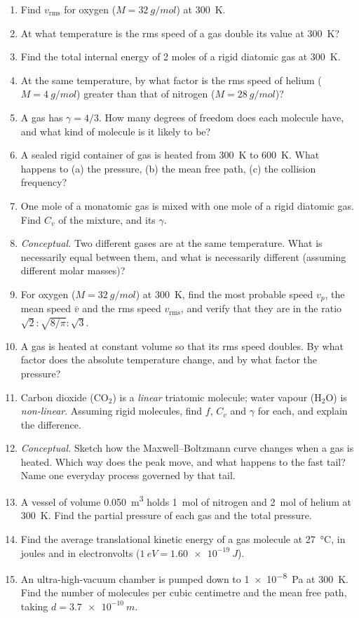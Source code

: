 \begin{enumerate}[itemsep=3pt]
\item Find $v_{\text{rms}}$ for oxygen ($M=\SI{32}{g/mol}$) at \SI{300}{K}.
\item At what temperature is the rms speed of a gas double its value at \SI{300}{K}?
\item Find the total internal energy of 2 moles of a rigid diatomic gas at \SI{300}{K}.
\item At the same temperature, by what factor is the rms speed of helium ($M=\SI{4}{g/mol}$) greater than
      that of nitrogen ($M=\SI{28}{g/mol}$)?
\item A gas has $\gamma = 4/3$. How many degrees of freedom does each molecule have, and what kind of
      molecule is it likely to be?
\item A sealed rigid container of gas is heated from \SI{300}{K} to \SI{600}{K}. What happens to
      (a) the pressure, (b) the mean free path, (c) the collision frequency?
\item One mole of a monatomic gas is mixed with one mole of a rigid diatomic gas. Find $C_v$ of the
      mixture, and its $\gamma$.
\item \emph{Conceptual.} Two different gases are at the same temperature. What is necessarily equal
      between them, and what is necessarily different (assuming different molar masses)?
\item For oxygen ($M=\SI{32}{g/mol}$) at \SI{300}{K}, find the most probable speed $v_p$, the mean
      speed $\bar v$ and the rms speed $v_{\text{rms}}$, and verify that they are in the ratio
      $\sqrt2:\sqrt{8/\pi}:\sqrt3$.
\item A gas is heated at constant volume so that its rms speed doubles. By what factor does the
      absolute temperature change, and by what factor the pressure?
\item Carbon dioxide (CO$_2$) is a \emph{linear} triatomic molecule; water vapour (H$_2$O) is
      \emph{non-linear}. Assuming rigid molecules, find $f$, $C_v$ and $\gamma$ for each, and explain
      the difference.
\item \emph{Conceptual.} Sketch how the Maxwell--Boltzmann curve changes when a gas is heated. Which way
      does the peak move, and what happens to the fast tail? Name one everyday process governed by that
      tail.
\item A vessel of volume \SI{0.050}{m^3} holds \SI{1}{mol} of nitrogen and \SI{2}{mol} of helium at
      \SI{300}{K}. Find the partial pressure of each gas and the total pressure.
\item Find the average translational kinetic energy of a gas molecule at \SI{27}{\celsius}, in joules
      and in electronvolts ($\SI{1}{eV}=\SI{1.60e-19}{J}$).
\item An ultra-high-vacuum chamber is pumped down to \SI{1e-8}{Pa} at \SI{300}{K}. Find the number of
      molecules per cubic centimetre and the mean free path, taking $d=\SI{3.7e-10}{m}$.
\end{enumerate}

